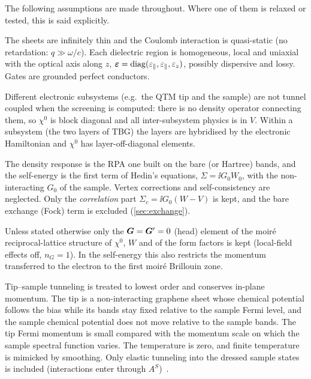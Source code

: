 The following assumptions are made throughout. Where one of them is relaxed or tested, this is said explicitly.

\begin{assumption}[Electrostatics]\label{as:electro}
The sheets are infinitely thin and the Coulomb interaction is quasi-static (no retardation:
$q\gg\omega/c$). Each dielectric region is homogeneous, local and uniaxial with the optical axis along $z$,
$\bm\varepsilon=\operatorname{diag}(\varepsilon_\parallel,\varepsilon_\parallel,\varepsilon_z)$, possibly dispersive and
lossy. Gates are grounded perfect conductors.
\end{assumption}

\begin{assumption}\label{as:decoupled}
Different electronic subsystems (e.g.\ the QTM tip and the sample) are not tunnel coupled when the
screening is computed: there is no density operator connecting them, so $\chi^0$ is block diagonal and all
inter-subsystem physics is in $V$. Within a subsystem (the two layers of TBG) the layers are hybridised by
the electronic Hamiltonian and $\chi^0$ has layer-off-diagonal elements.
\end{assumption}

\begin{assumption}\label{as:gw}
The density response is the RPA one built on the bare (or Hartree) bands, and the self-energy is the first
term of Hedin's equations, $\Sigma=\ii G_0W_0$, with the non-interacting $G_0$ of the sample. Vertex
corrections and self-consistency are neglected. Only the \emph{correlation} part
$\Sigma_c=\ii G_0(W-V)$ is kept, and the bare exchange (Fock) term is excluded (\cref{sec:exchange}).
\end{assumption}

\begin{assumption}\label{as:head}
Unless stated otherwise only the $\bm G=\bm G'=0$ (head) element of the moir\'e reciprocal-lattice structure of
$\chi^0$, $W$ and of the form factors is kept (local-field effects off, $n_G=1$). In the self-energy this also restricts the
momentum transferred to the electron to the first moir\'e Brillouin zone.
\end{assumption}

\begin{assumption}\label{as:qtm}
Tip--sample tunneling is treated to lowest order and conserves in-plane momentum. The tip is a non-interacting
graphene sheet whose chemical potential follows the bias while its bands stay fixed relative to the sample Fermi
level, and the sample chemical potential does not move relative to the sample bands. The tip Fermi momentum is small
compared with the momentum scale on which the sample spectral function varies. The temperature is zero, and finite
temperature is mimicked by smoothing.
Only elastic tunneling into the dressed sample states is included (interactions enter through $A^S$)~\cite{Wei2025}.
\end{assumption}

